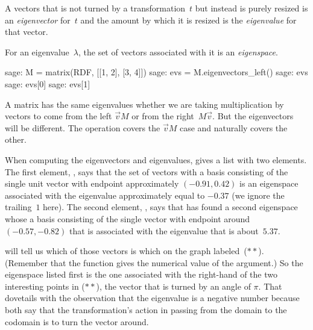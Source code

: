 A vectors that is not turned by a transformation~$t$ but instead
is purely resized 
is an \textit{eigenvector} for~$t$ and the amount by which it is 
resized is the \textit{eigenvalue} for that vector.

For an eigenvalue~$\lambda$, the set of vectors associated with
it is an \textit{eigenspace}.
\begin{sagecommandline}
sage: M = matrix(RDF, [[1, 2], [3, 4]])
sage: evs = M.eigenvectors_left()
sage: evs
sage: evs[0] 
sage: evs[1]
\end{sagecommandline}
\noindent
A matrix has the same eigenvalues whether we are taking multiplication 
by vectors to come from the left $\vec{v}M$ or from the 
right~$M\vec{v}$.  
But the eigenvectors will be different. 
The \Sage{} operation  covers the 
$\vec{v}M$ case and naturally 
covers the other.

When computing the eigenvectors and eigenvalues, \Sage{} gives a list
with two elements.
The first element, , 
says that the set of vectors with a basis consisting of the single unit
vector with endpoint approximately $(-0.91, 0.42)$  is an
eigenspace associated with the eigenvalue approximately equal to $-0.37$
(we ignore the trailing~$1$ here).
The second element, , 
says that \Sage{} has found a second eigenspace
whose a basis consisting of the single vector with endpoint around
$(-0.57, -0.82)$ that is associated with the
eigenvalue that is about~$5.37$. 

\Sage{} will tell us which of those vectors is which on the graph 
labeled~($**$).
(Remember that the  function gives the numerical value of
the argument.)
So the eigenspace listed first is the one associated with the right-hand
of the two interesting points in ($**$), the vector that is turned by an angle
of $\pi$.
That dovetails with the observation that the eigenvalue is a negative number 
because both say that the transformation's action in passing from the
domain to the codomain is to turn the vector around.

